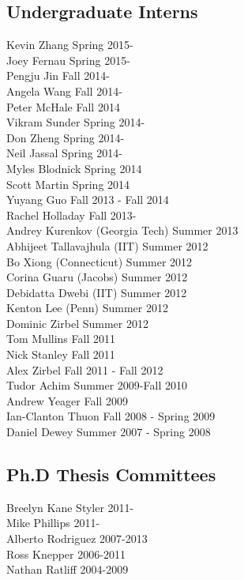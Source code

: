 \documentclass[10pt]{article}
\begin{document}
\subsection{Undergraduate Interns}
\noindent
Kevin Zhang  \hfill Spring 2015-\\
Joey Fernau  \hfill Spring 2015-\\
Pengju Jin  \hfill Fall 2014-\\
Angela Wang  \hfill Fall 2014-\\
Peter McHale  \hfill Fall 2014\\
Vikram Sunder  \hfill Spring 2014-\\
Don Zheng  \hfill Spring 2014-\\
Neil Jassal  \hfill Spring 2014-\\
Myles Blodnick  \hfill Spring 2014\\
Scott Martin  \hfill Spring 2014\\
Yuyang Guo  \hfill Fall 2013 - Fall 2014\\
Rachel Holladay  \hfill Fall 2013-\\
Andrey Kurenkov (Georgia Tech) \hfill Summer 2013\\ 
Abhijeet Tallavajhula (IIT) \hfill Summer 2012\\
Bo Xiong (Connecticut) \hfill Summer 2012\\
Corina Guaru (Jacobs) \hfill Summer 2012\\
Debidatta Dwebi (IIT) \hfill Summer 2012\\
Kenton Lee (Penn) \hfill Summer 2012\\
Dominic Zirbel  \hfill Summer 2012\\
Tom Mullins  \hfill Fall 2011\\
Nick Stanley  \hfill Fall 2011\\
Alex Zirbel  \hfill Fall 2011 - Fall 2012\\
Tudor Achim  \hfill Summer 2009-Fall 2010\\
Andrew Yeager  \hfill Fall 2009\\
Ian-Clanton Thuon  \hfill Fall 2008 - Spring 2009\\
Daniel Dewey  \hfill Summer 2007 - Spring 2008\\

\subsection{Ph.D Thesis Committees}
\noindent
Breelyn Kane Styler  \hfill 2011-\\ 
Mike Phillips  \hfill 2011-\\
Alberto Rodriguez  \hfill 2007-2013\\
Ross Knepper  \hfill 2006-2011\\
Nathan Ratliff  \hfill 2004-2009\\
\end{document}
